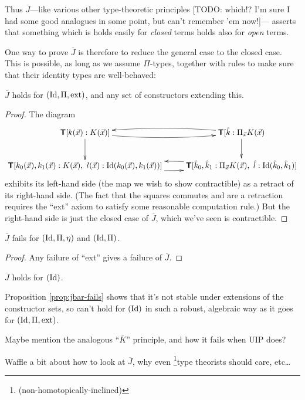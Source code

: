 \documentclass{amsart}
\newcommand{\ext}{\mathrm{ext}}
\newcommand{\Jbar}{\overline{J}}
\begin{document}
Thus $\Jbar$---like various other type-theoretic principles [TODO: which!?  I'm sure I had some good analogues in some point, but can't remember 'em now!]--- asserts that something which is holds easily for \emph{closed} terms holds also for \emph{open} terms.

One way to prove $\Jbar$ is therefore to reduce the general case to the closed case.  This is possible, as long as we assume $\Pi$-types, together with rules to make sure that their identity types are well-behaved:

\begin{proposition} \label{prop:jbar-holds}
$\Jbar$ holds for $(\Id,\Pi,\ext)$, and any set of constructors extending this.
\end{proposition}

\begin{proof}
The diagram
$$\xymatrix{\T[k(\x):K(\x)] \ar[d] \ar@/_/[r] & \ar@/_/[l] \T[\hat{k}:\Pi_{\x} K(\x) \ar[d] \\ 
\T[k_0(\x),k_1(\x):K(\x),\ l(\x):\Id(k_0(\x),k_1(\x))] \ar@/_/[r] & \ar@/_/[l] \T[\hat{k}_0,\hat{k}_1 : \Pi_{\x} K(\x),\ \hat{l}:\Id(\hat{k}_0,\hat{k}_1)]}$$
exhibits its left-hand side (the map we wish to show contractible) as a retract of its right-hand side.  (The fact that the squares commutes and are a retraction requires the ``ext'' axiom to satisfy some reasonable computation rule.)  But the right-hand side is just the closed case of $\Jbar$, which we've seen is contractible.
\end{proof}

\begin{proposition} \label{prop:jbar-fails}
$\Jbar$ fails for $(\mathrm{Id},\Pi,\eta)$ and $(\mathrm{Id},\Pi)$. 
\end{proposition}

\begin{proof}
Any failure of ``ext'' gives a failure of $\Jbar$.
\end{proof}

\begin{conjecture}
$\Jbar$ holds for $(\mathrm{Id})$.
\end{conjecture}

Proposition \ref{prop:jbar-fails} shows that it's not stable under extensions of the constructor sets, so can't hold for $(\mathrm{Id})$ in such a robust, algebraic way as it goes for $(\Id,\Pi,\ext)$.

Maybe mention the analogous ``$\overline{K}$'' principle, and how it fails when UIP does?

Waffle a bit about how to look at $\Jbar$, why even \footnote{(non-homotopically-inclined)}type theorists should care, etc\ldots
\end{document}
